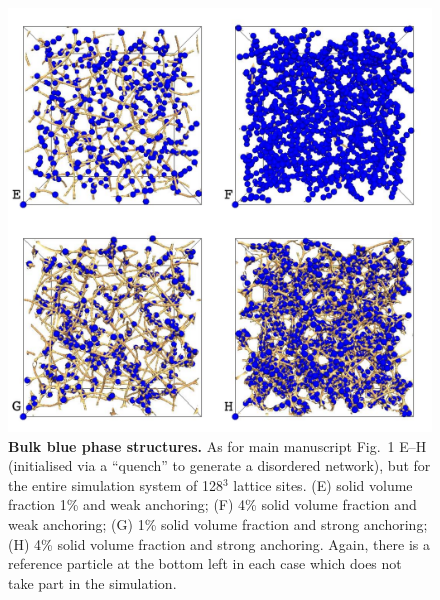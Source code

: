 \documentclass[12pt,twoside]{article}
\begin{document}
\begin{figure}[!h]
\begin{center}
\includegraphics[scale=0.35]{support-fig3.pdf}
\end{center}
\caption{\textbf{Bulk blue phase structures.}
As for main manuscript Fig.~1 E--H (initialised via a ``quench''
to generate a disordered network), but for the entire simulation
system of 128$^3$ lattice sites. (E) solid volume fraction 1\% and
weak anchoring; (F) 4\% solid volume fraction and weak anchoring;
(G) 1\% solid volume fraction and strong anchoring; (H) 4\% solid
volume fraction and strong anchoring. Again, there is a reference
particle at the bottom left in each case which does not take part
in the simulation.}
\end{figure}

\newpage
\end{document}

